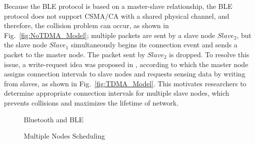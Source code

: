 \documentclass[10pt,journal,compsoc]{IEEEtran}
\begin{document}
Because the BLE protocol is based on a master-slave relationship, the BLE protocol does not support CSMA/CA with a shared physical channel, and therefore, the collision problem \cite{wang2007upstream, osthus2011concurrent, mikhaylov2014accelerated, jang2013asynchronous} can occur, as shown in Fig.~\ref{fig:NoTDMA_Model}; multiple packets are sent by a slave node $Slave_2$, but the slave node $Slave_1$ simultaneously begins its connection event and sends a packet to the master node. The packet sent by $Slave_2$ is dropped. To resolve this issue, a write-request idea was proposed in \cite{kindt2015adaptive}, according to which the master node assigns connection intervals to slave nodes and requests sensing data by writing from slaves, as shown in Fig.~\ref{fig:TDMA_Model}. This motivates researchers to determine appropriate connection intervals for multiple slave nodes, which prevents collisions and maximizes the lifetime of network.

\begin{figure*}[tbhp!!]
\begin{minipage}[b]{\linewidth}
\vspace{-0.5em}
\centering
{}\vspace{-0.5em}
\caption{Bluetooth and BLE} \label{star_topology} %
\end{minipage}
\end{figure*}

\begin{figure*}[tbhp!!]
\begin{minipage}[b]{\linewidth}
\vspace{-0.5em}
\centering
{}\vspace{-0.5em}
\caption{Multiple Nodes Scheduling} \label{NoTDMA_vs_TDMA} %
\end{minipage}
\end{figure*}
\end{document}
